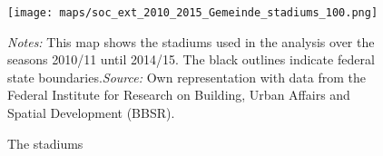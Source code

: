 \vspace*{\fill}
\begin{figure}[H]\centering
	\caption{The stadiums}\label{fig_soc_ext:map_gem_stadiums}
	\texttt{[image: maps/soc\_ext\_2010\_2015\_Gemeinde\_stadiums\_100.png]}
	\begin{minipage}{0.95\linewidth}
		\scriptsize{\emph{Notes:} This map shows the stadiums used in the analysis over the seasons 2010/11 until 2014/15. The black outlines indicate federal state boundaries.\newline \emph{Source:} Own representation with data from the Federal Institute for Research on Building, Urban Affairs and Spatial Development (BBSR).}
	\end{minipage}
\end{figure}
